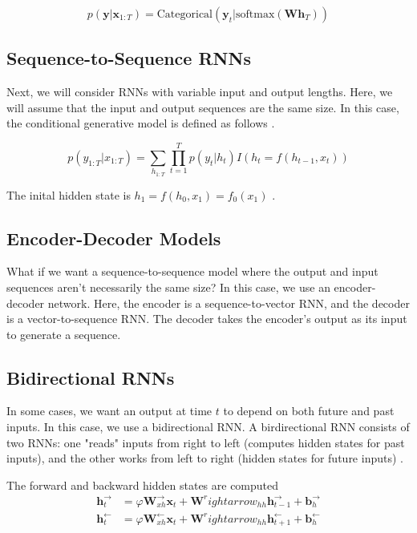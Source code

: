 \documentclass{article}
\begin{document}
\[p(\bm{y}|\bm{x}_{1:T}) = \text{Categorical}(\bm{y}_t|\text{softmax}(\bm{W}\bm{h}_T))\]

\subsection{Sequence-to-Sequence RNNs}

Next, we will consider RNNs with variable input and output lengths. Here, we will assume that the input and output sequences are the same size. In this case, the conditional generative model is defined as follows \cite{pml1book}.

\[p(y_{1:T}|x_{1:T}) = \sum_{h_{1:T}}\prod^T_{t=1}p(y_t|h_t)I(h_t=f(h_{t-1},x_t))\]

The inital hidden state is \(h_1 = f(h_0, x_1) = f_0(x_1)\) \cite{pml1book}. 

\subsection{Encoder-Decoder Models}

What if we want a sequence-to-sequence model where the output and input sequences aren't necessarily the same size? In this case, we use an encoder-decoder network. Here, the encoder is a sequence-to-vector RNN, and the decoder is a vector-to-sequence RNN. The decoder takes the encoder's output as its input to generate a sequence.

\subsection{Bidirectional RNNs}

In some cases, we want an output at time \(t\) to depend on both future and past inputs. In this case, we use a bidirectional RNN. A birdirectional RNN consists of two RNNs: one "reads" inputs from right to left (computes hidden states for past inputs), and the other works from left to right (hidden states for future inputs) \cite{pml1book}\cite{hands-on-ml}.

The forward and backward hidden states are computed
\begin{align*}
    \bm{h}^\rightarrow_t &= \varphi{\bm{W}^\rightarrow_{xh}\bm{x}_t + \bm{W}^rightarrow_{hh}\bm{h}^\rightarrow_{t-1}+\bm{b}^\rightarrow_h} \\
    \bm{h}^\leftarrow_t &= \varphi{\bm{W}^\leftarrow_{xh}\bm{x}_t + \bm{W}^rightarrow_{hh}\bm{h}^\leftarrow_{t+1}+\bm{b}^\leftarrow_h} \\
\end{align*}
\end{document}

